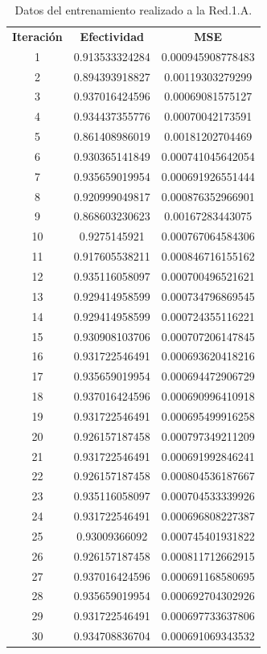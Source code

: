 \documentclass{iccmemoria}
\begin{document}
\begin{longtable}{ccc} 
\caption{Datos del entrenamiento realizado a la Red.1.A.}\label{tab:training Red.1.A}\\

	\addlinespace
	\toprule
	\multicolumn{3}{c}{{\bf Entrenamiento Red.1.A}} \\
	\midrule
	{\bf Iteración} & {\bf Efectividad} & {\bf MSE} \\
	1 & 0.913533324284 & 0.000945908778483 \\
	2 & 0.894393918827 & 0.00119303279299 \\
	3 & 0.937016424596 & 0.00069081575127 \\
	4 & 0.934437355776 & 0.00070042173591 \\
	5 & 0.861408986019 & 0.00181202704469 \\
	6 & 0.930365141849 & 0.000741045642054 \\
	7 & 0.935659019954 & 0.000691926551444 \\
	8 & 0.920999049817 & 0.000876352966901 \\
	9 & 0.868603230623 & 0.00167283443075 \\
	10 & 0.9275145921 & 0.000767064584306 \\
	11 & 0.917605538211 & 0.000846716155162 \\
	12 & 0.935116058097 & 0.000700496521621 \\
	13 & 0.929414958599 & 0.000734796869545 \\
	14 & 0.929414958599 & 0.000724355116221 \\
	15 & 0.930908103706 & 0.000707206147845 \\
	16 & 0.931722546491 & 0.000693620418216 \\
	17 & 0.935659019954 & 0.000694472906729 \\
	18 & 0.937016424596 & 0.000690996410918 \\
	19 & 0.931722546491 & 0.000695499916258 \\
	20 & 0.926157187458 & 0.000797349211209 \\
	21 & 0.931722546491 & 0.000691992846241 \\
	22 & 0.926157187458 & 0.000804536187667 \\
	23 & 0.935116058097 & 0.000704533339926 \\
	24 & 0.931722546491 & 0.000696808227387 \\
	25 & 0.93009366092 & 0.000745401931822 \\
	26 & 0.926157187458 & 0.000811712662915 \\
	27 & 0.937016424596 & 0.000691168580695 \\
	28 & 0.935659019954 & 0.000692704302926 \\
	29 & 0.931722546491 & 0.000697733637806 \\
	30 & 0.934708836704 & 0.000691069343532 \\
	\bottomrule

\end{longtable}
\end{document}
